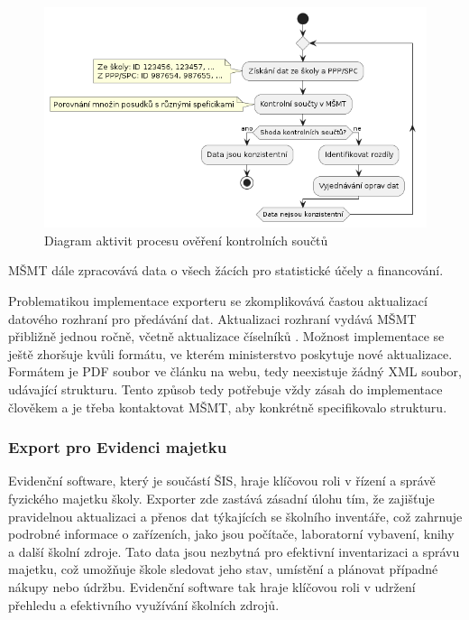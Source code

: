 \documentclass[FM,Proj]{tulthesis}
\begin{document}
\begin{figure}[H]
    \includegraphics[width=\textwidth-28pt]{act-proces-kontrolnich-souctu.png}
    \caption{Diagram aktivit procesu ověření kontrolních součtů}
    \label{fig:act-proces-kontrolnich-souctu}
\end{figure}

MŠMT dále zpracovává data o všech žácích pro statistické účely a financování. 

Problematikou implementace exporteru se zkomplikovává častou aktualizací datového rozhraní
pro předávání dat. Aktualizaci rozhraní vydává MŠMT přibližně jednou ročně, včetně aktualizace
číselníků \cite{msmt-rozhrani-predavani-dat-2023}. Možnost implementace se ještě zhoršuje kvůli formátu,
ve kterém ministerstvo poskytuje nové aktualizace. Formátem je PDF soubor ve článku na webu, tedy
neexistuje žádný XML soubor, udávající strukturu. Tento způsob tedy potřebuje vždy zásah do implementace
člověkem a je třeba kontaktovat MŠMT, aby konkrétně specifikovalo strukturu.

\subsubsection{Export pro Evidenci majetku} \label{section:export-pro-evidenci-majetku} 
Evidenční software, který je součástí ŠIS, hraje klíčovou roli v řízení a správě fyzického
majetku školy. Exporter zde zastává zásadní úlohu tím, že zajišťuje pravidelnou aktualizaci 
a přenos dat týkajících se školního inventáře, což zahrnuje podrobné informace o zařízeních,
jako jsou počítače, laboratorní vybavení, knihy a další školní zdroje. Tato data jsou 
nezbytná pro efektivní inventarizaci a správu majetku, což umožňuje škole sledovat jeho 
stav, umístění a plánovat případné nákupy nebo údržbu. Evidenční software tak hraje
klíčovou roli v udržení přehledu a efektivního využívání školních zdrojů. 
\end{document}

